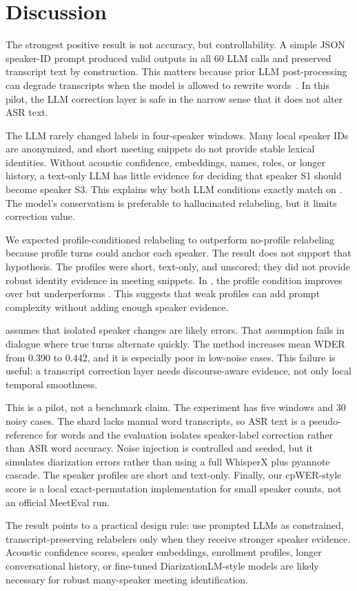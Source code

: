 \section{Discussion}
\label{sec:discussion}

 The strongest positive result is not accuracy, but controllability. A simple JSON speaker-ID prompt produced valid outputs in all 60 LLM calls and preserved transcript text by construction. This matters because prior LLM post-processing can degrade transcripts when the model is allowed to rewrite words~\cite{wang2024diarizationlm}. In this pilot, the LLM correction layer is safe in the narrow sense that it does not alter ASR text.

 The LLM rarely changed labels in four-speaker \amisdm windows. Many local speaker IDs are anonymized, and short meeting snippets do not provide stable lexical identities. Without acoustic confidence, embeddings, names, roles, or longer history, a text-only LLM has little evidence for deciding that speaker \textsc{S1} should become speaker \textsc{S3}. This explains why both LLM conditions exactly match \noisylabels on \amisdm. The model's conservatism is preferable to hallucinated relabeling, but it limits correction value.

 We expected profile-conditioned relabeling to outperform no-profile relabeling because profile turns could anchor each speaker. The result does not support that hypothesis. The profiles were short, text-only, and unscored; they did not provide robust identity evidence in meeting snippets. In \simsamu, the profile condition improves over \noisylabels but underperforms \llmnoprofile. This suggests that weak profiles can add prompt complexity without adding enough speaker evidence.

 \smooth assumes that isolated speaker changes are likely errors. That assumption fails in dialogue where true turns alternate quickly. The method increases mean WDER from 0.390 to 0.442, and it is especially poor in \simsamu low-noise cases. This failure is useful: a transcript correction layer needs discourse-aware evidence, not only local temporal smoothness.

 This is a pilot, not a benchmark claim. The experiment has five windows and 30 noisy cases. The \amisdm shard lacks manual word transcripts, so ASR text is a pseudo-reference for words and the evaluation isolates speaker-label correction rather than ASR word accuracy. Noise injection is controlled and seeded, but it simulates diarization errors rather than using a full WhisperX plus pyannote cascade. The speaker profiles are short and text-only. Finally, our cpWER-style score is a local exact-permutation implementation for small speaker counts, not an official MeetEval run.

 The result points to a practical design rule: use prompted LLMs as constrained, transcript-preserving relabelers only when they receive stronger speaker evidence. Acoustic confidence scores, speaker embeddings, enrollment profiles, longer conversational history, or fine-tuned DiarizationLM-style models are likely necessary for robust many-speaker meeting identification.
